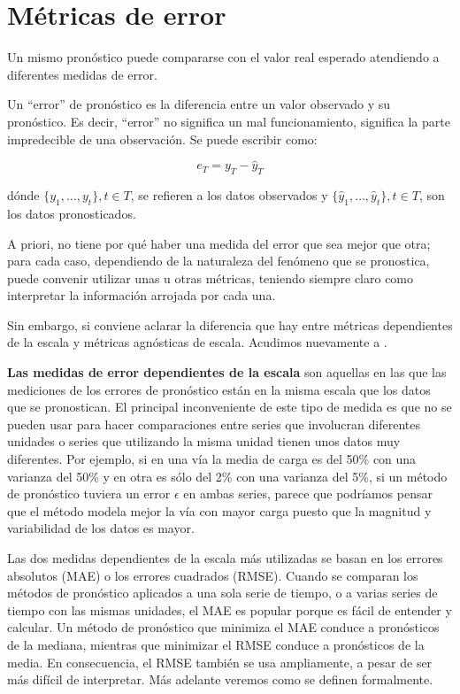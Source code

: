 \documentclass[]{book}
\begin{document}
\section{Métricas de error}\label{metricas-de-error}

Un mismo pronóstico puede compararse con el valor real esperado
atendiendo a diferentes medidas de error.

Un ``error'' de pronóstico es la diferencia entre un valor observado y
su pronóstico. Es decir, ``error'' no significa un mal funcionamiento,
significa la parte impredecible de una observación. Se puede escribir
como:

\[e_T = y_T - \hat{y}_T\]

dónde \(\{ y_1, \dots, y_t \}, t \in T\), se refieren a los datos
observados y \(\{ \hat{y}_1, \dots, \hat{y}_t \}, t \in T\), son los
datos pronosticados.

A priori, no tiene por qué haber una medida del error que sea mejor que
otra; para cada caso, dependiendo de la naturaleza del fenómeno que se
pronostica, puede convenir utilizar unas u otras métricas, teniendo
siempre claro como interpretar la información arrojada por cada una.

Sin embargo, si conviene aclarar la diferencia que hay entre métricas
dependientes de la escala y métricas agnósticas de escala. Acudimos
nuevamente a \citep{Forecast6-online}.

\textbf{Las medidas de error dependientes de la escala} son aquellas en
las que las mediciones de los errores de pronóstico están en la misma
escala que los datos que se pronostican. El principal inconveniente de
este tipo de medida es que no se pueden usar para hacer comparaciones
entre series que involucran diferentes unidades o series que utilizando
la misma unidad tienen unos datos muy diferentes. Por ejemplo, si en una
vía la media de carga es del 50\% con una varianza del 50\% y en otra es
sólo del 2\% con una varianza del 5\%, si un método de pronóstico
tuviera un error \(\epsilon\) en ambas series, parece que podríamos
pensar que el método modela mejor la vía con mayor carga puesto que la
magnitud y variabilidad de los datos es mayor.

Las dos medidas dependientes de la escala más utilizadas se basan en los
errores absolutos (MAE) o los errores cuadrados (RMSE). Cuando se
comparan los métodos de pronóstico aplicados a una sola serie de tiempo,
o a varias series de tiempo con las mismas unidades, el MAE es popular
porque es fácil de entender y calcular. Un método de pronóstico que
minimiza el MAE conduce a pronósticos de la mediana, mientras que
minimizar el RMSE conduce a pronósticos de la media. En consecuencia, el
RMSE también se usa ampliamente, a pesar de ser más difícil de
interpretar. Más adelante veremos como se definen formalmente.
\end{document}

